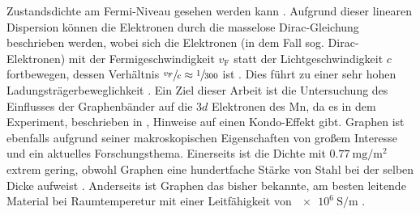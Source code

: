 Zustandsdichte am Fermi-Niveau gesehen werden kann \cite{10.1093/nsr/nwu080}. 
Aufgrund dieser linearen Dispersion können die Elektronen durch die masselose Dirac-Gleichung beschrieben werden, wobei sich 
die Elektronen (in dem Fall sog. Dirac-Elektronen) mit der Fermigeschwindigkeit $v_\text{F}$ statt der Lichtgeschwindigkeit $c$ fortbewegen,
dessen Verhältnis $\sfrac{v_\text{F}}{c} \approx \sfrac{1}{300}$ ist \cite{Avouris2007}.
Dies führt zu einer sehr hohen Ladungsträgerbeweglichkeit \cite{https://doi.org/10.1002/adma.201201482}.
Ein Ziel dieser Arbeit ist die Untersuchung des Einflusses der Graphenbänder auf die $3d$ Elektronen des Mn, da es in dem Experiment, 
beschrieben in \cite{doi:10.1021/acsnano.1c00139}, Hinweise auf einen Kondo-Effekt gibt.
Graphen ist ebenfalls aufgrund seiner makroskopischen Eigenschaften von großem Interesse und ein aktuelles Forschungsthema.
Einerseits ist die  Dichte mit $\qty{0.77}{\milli\gram\per\metre\squared}$ extrem gering, obwohl 
Graphen eine hundertfache Stärke von Stahl bei der selben Dicke aufweist \cite{graphene_properties}. 
Anderseits ist Graphen das bisher bekannte, am besten leitende Material bei Raumtemperetur mit einer Leitfähigkeit von 
$\qty{e6}{\siemens\per\metre}$ \cite{graphene_properties}.
